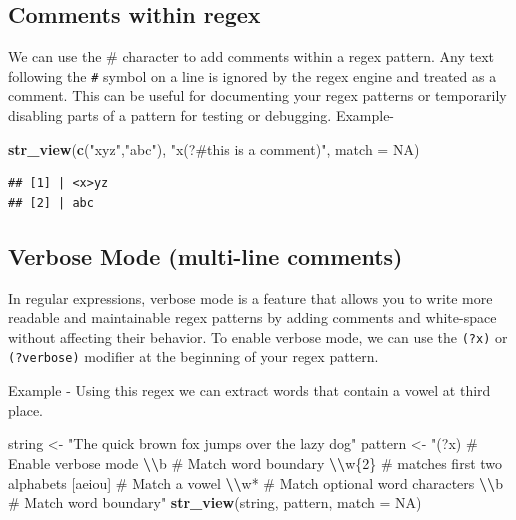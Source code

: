 \documentclass[
]{book}
\newenvironment{Shaded}{\begin{snugshade}}{\end{snugshade}}
\newcommand{\AttributeTok}[1]{\textcolor[rgb]{0.13,0.29,0.53}{#1}}
\newcommand{\ConstantTok}[1]{\textcolor[rgb]{0.56,0.35,0.01}{#1}}
\newcommand{\FunctionTok}[1]{\textcolor[rgb]{0.13,0.29,0.53}{\textbf{#1}}}
\newcommand{\NormalTok}[1]{#1}
\newcommand{\OtherTok}[1]{\textcolor[rgb]{0.56,0.35,0.01}{#1}}
\newcommand{\SpecialCharTok}[1]{\textcolor[rgb]{0.81,0.36,0.00}{\textbf{#1}}}
\newcommand{\StringTok}[1]{\textcolor[rgb]{0.31,0.60,0.02}{#1}}
\begin{document}
\hypertarget{comments-within-regex}{%
\subsection{Comments within regex}\label{comments-within-regex}}

We can use the \# character to add comments within a regex pattern. Any text following the \texttt{\#} symbol on a line is ignored by the regex engine and treated as a comment. This can be useful for documenting your regex patterns or temporarily disabling parts of a pattern for testing or debugging. Example-

\begin{Shaded}
\begin{Highlighting}[]
\FunctionTok{str\_view}\NormalTok{(}\FunctionTok{c}\NormalTok{(}\StringTok{"xyz"}\NormalTok{,}\StringTok{"abc"}\NormalTok{), }\StringTok{"x(?\#this is a comment)"}\NormalTok{, }\AttributeTok{match =} \ConstantTok{NA}\NormalTok{)}
\end{Highlighting}
\end{Shaded}

\begin{verbatim}
## [1] | <x>yz
## [2] | abc
\end{verbatim}

\hypertarget{verbose-mode-multi-line-comments}{%
\subsection{Verbose Mode (multi-line comments)}\label{verbose-mode-multi-line-comments}}

In regular expressions, verbose mode is a feature that allows you to write more readable and maintainable regex patterns by adding comments and white-space without affecting their behavior. To enable verbose mode, we can use the \texttt{(?x)} or \texttt{(?verbose)} modifier at the beginning of your regex pattern.

Example - Using this regex we can extract words that contain a vowel at third place.

\begin{Shaded}
\begin{Highlighting}[]
\NormalTok{string }\OtherTok{\textless{}{-}} \StringTok{"The quick brown fox jumps over the lazy dog"}
\NormalTok{pattern }\OtherTok{\textless{}{-}} \StringTok{"(?x)      \# Enable verbose mode}
\StringTok{            }\SpecialCharTok{\textbackslash{}\textbackslash{}}\StringTok{b       \# Match word boundary}
\StringTok{            }\SpecialCharTok{\textbackslash{}\textbackslash{}}\StringTok{w\{2\}    \# matches first two alphabets}
\StringTok{            [aeiou]   \# Match a vowel}
\StringTok{            }\SpecialCharTok{\textbackslash{}\textbackslash{}}\StringTok{w*      \# Match optional word characters}
\StringTok{            }\SpecialCharTok{\textbackslash{}\textbackslash{}}\StringTok{b       \# Match word boundary"}
\FunctionTok{str\_view}\NormalTok{(string, pattern, }\AttributeTok{match =} \ConstantTok{NA}\NormalTok{)}
\end{Highlighting}
\end{Shaded}
\end{document}
